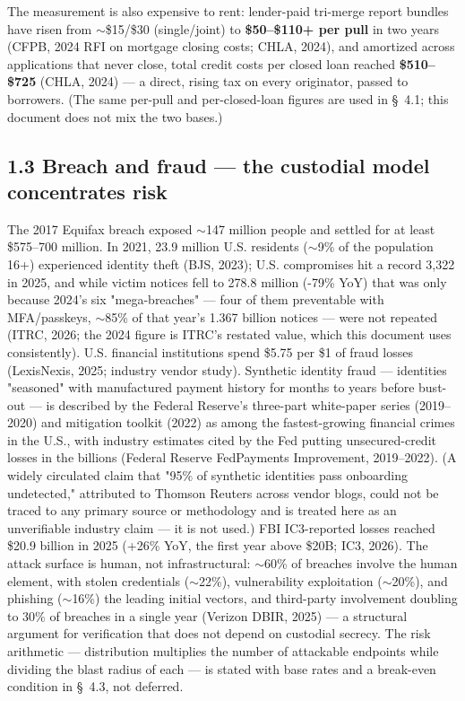 \documentclass[11pt,twocolumn]{article}
\begin{document}
The measurement is also expensive to rent: lender-paid tri-merge report bundles have risen from $\sim$\$15/\$30 (single/joint) to \textbf{\$50--\$110+ per pull} in two years (CFPB, 2024 RFI on mortgage closing costs; CHLA, 2024), and amortized across applications that never close, total credit costs per closed loan reached \textbf{\$510--\$725} (CHLA, 2024) --- a direct, rising tax on every originator, passed to borrowers. (The same per-pull and per-closed-loan figures are used in \S~4.1; this document does not mix the two bases.)

\subsection*{1.3 Breach and fraud --- the custodial model concentrates risk}

The 2017 Equifax breach exposed $\sim$147 million people and settled for at least \$575--700 million. In 2021, 23.9 million U.S. residents ($\sim$9\% of the population 16+) experienced identity theft (BJS, 2023); U.S. compromises hit a record 3,322 in 2025, and while victim notices fell to 278.8 million (-79\% YoY) that was only because 2024's six "mega-breaches" --- four of them preventable with MFA/passkeys, $\sim$85\% of that year's 1.367 billion notices --- were not repeated (ITRC, 2026; the 2024 figure is ITRC's restated value, which this document uses consistently). U.S. financial institutions spend \$5.75 per \$1 of fraud losses (LexisNexis, 2025; industry vendor study). Synthetic identity fraud --- identities "seasoned" with manufactured payment history for months to years before bust-out --- is described by the Federal Reserve's three-part white-paper series (2019--2020) and mitigation toolkit (2022) as among the fastest-growing financial crimes in the U.S., with industry estimates cited by the Fed putting unsecured-credit losses in the billions (Federal Reserve FedPayments Improvement, 2019--2022). (A widely circulated claim that "95\% of synthetic identities pass onboarding undetected," attributed to Thomson Reuters across vendor blogs, could not be traced to any primary source or methodology and is treated here as an unverifiable industry claim --- it is not used.) FBI IC3-reported losses reached \$20.9 billion in 2025 (+26\% YoY, the first year above \$20B; IC3, 2026). The attack surface is human, not infrastructural: $\sim$60\% of breaches involve the human element, with stolen credentials ($\sim$22\%), vulnerability exploitation ($\sim$20\%), and phishing ($\sim$16\%) the leading initial vectors, and third-party involvement doubling to 30\% of breaches in a single year (Verizon DBIR, 2025) --- a structural argument for verification that does not depend on custodial secrecy. The risk arithmetic --- distribution multiplies the number of attackable endpoints while dividing the blast radius of each --- is stated with base rates and a break-even condition in \S~4.3, not deferred.
\end{document}
